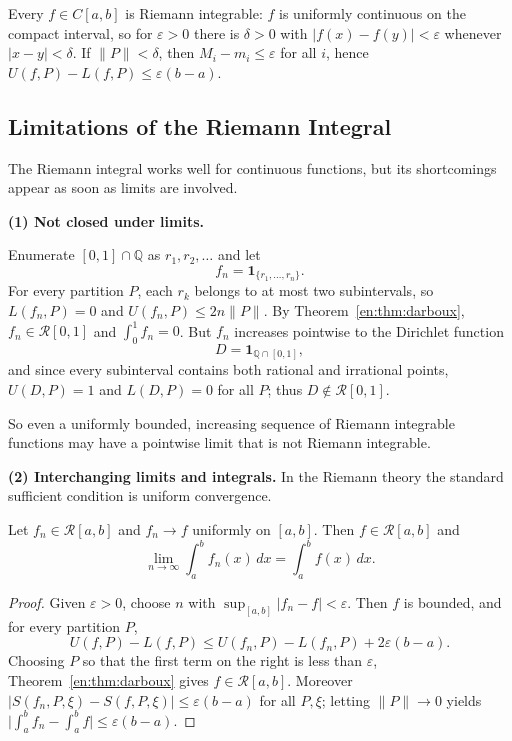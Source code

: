 \documentclass[11pt]{article}
\makeatletter
\newcommand{\envlabel}[1]{\protected@edef\@currentlabel{\themathenv}\label{#1}}
\makeatother
\begin{document}
\begin{example}
Every $f\in C[a,b]$ is Riemann integrable: $f$ is uniformly continuous on the compact interval, so for $\varepsilon>0$ there is $\delta>0$ with $|f(x)-f(y)|<\varepsilon$ whenever $|x-y|<\delta$. If $\|P\|<\delta$, then $M_{i}-m_{i}\leq\varepsilon$ for all $i$, hence $U(f,P)-L(f,P)\leq\varepsilon(b-a)$.
\end{example}

\subsection{Limitations of the Riemann Integral}

The Riemann integral works well for continuous functions, but its shortcomings appear as soon as limits are involved.

\textbf{(1) Not closed under limits.}

\begin{example}\envlabel{en:ex:dirichlet}
Enumerate $[0,1]\cap\mathbb{Q}$ as $r_{1},r_{2},\ldots$ and let
\[
f_{n}=\mathbf{1}_{\{r_{1},\ldots,r_{n}\}}.
\]
For every partition $P$, each $r_{k}$ belongs to at most two subintervals, so $L(f_{n},P)=0$ and $U(f_{n},P)\leq2n\|P\|$. By Theorem~\ref{en:thm:darboux}, $f_{n}\in\mathcal{R}[0,1]$ and $\int_{0}^{1}f_{n}=0$. But $f_{n}$ increases pointwise to the Dirichlet function
\[
D=\mathbf{1}_{\mathbb{Q}\cap[0,1]},
\]
and since every subinterval contains both rational and irrational points, $U(D,P)=1$ and $L(D,P)=0$ for all $P$; thus $D\notin\mathcal{R}[0,1]$.

So even a uniformly bounded, increasing sequence of Riemann integrable functions may have a pointwise limit that is not Riemann integrable.
\end{example}

\textbf{(2) Interchanging limits and integrals.} In the Riemann theory the standard sufficient condition is uniform convergence.

\begin{proposition}\envlabel{en:prop:unif}
Let $f_{n}\in\mathcal{R}[a,b]$ and $f_{n}\to f$ uniformly on $[a,b]$. Then $f\in\mathcal{R}[a,b]$ and
\[
\lim_{n\to\infty}\int_{a}^{b}f_{n}(x)\,dx=\int_{a}^{b}f(x)\,dx.
\]
\end{proposition}

\begin{proof}
Given $\varepsilon>0$, choose $n$ with $\sup_{[a,b]}|f_{n}-f|<\varepsilon$. Then $f$ is bounded, and for every partition $P$,
\[
U(f,P)-L(f,P)\leq U(f_{n},P)-L(f_{n},P)+2\varepsilon(b-a).
\]
Choosing $P$ so that the first term on the right is less than $\varepsilon$, Theorem~\ref{en:thm:darboux} gives $f\in\mathcal{R}[a,b]$. Moreover $|S(f_{n},P,\xi)-S(f,P,\xi)|\leq\varepsilon(b-a)$ for all $P,\xi$; letting $\|P\|\to0$ yields $\big|\int_{a}^{b}f_{n}-\int_{a}^{b}f\big|\leq\varepsilon(b-a)$.
\end{proof}
\end{document}
